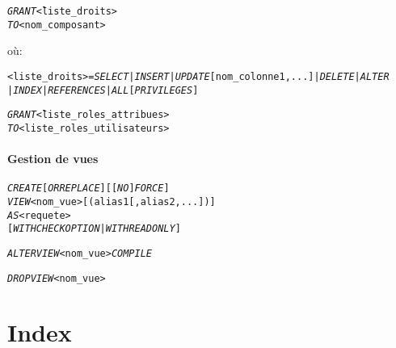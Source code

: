 \documentclass[10pt]{article}
\begin{document}
			\begin{alltt}
				\begin{tabbing}
					\emph{GRANT} \= <liste_droits>\\
					\emph{TO} \> <nom_composant>\\
					[\emph{WITH GRANT OPTION}]
				\end{tabbing}
			\end{alltt}
			
			où:
			\begin{alltt}
				\begin{tabbing}
					<liste_droits> =\= \emph{SELECT} | \emph{INSERT} | \emph{UPDATE} [nom_colonne1,...] | \emph{DELETE} | \emph{ALTER} \\
								\> | \emph{INDEX} | \emph{REFERENCES} | \emph{ALL} [\emph{PRIVILEGES}]
				\end{tabbing}
			\end{alltt}
			
			\begin{alltt}
				\begin{tabbing}
					\emph{GRANT} \= <liste_roles_attribues>\\
					\emph{TO} \> <liste_roles_utilisateurs>\\
					[\emph{WITH ADMIN OPTION}]
				\end{tabbing}
			\end{alltt}
			
		\subsection{Gestion de vues}
			\begin{alltt}
				\emph{CREATE} [\emph{OR REPLACE}] [[\emph{NO}] \emph{FORCE}]
				\emph{VIEW} <nom_vue> [(alias1[,alias2,...])]
				\emph{AS} <requete>
				[\emph{WITH CHECK OPTION} | \emph{WITH READ ONLY}]
				
				\emph{ALTER VIEW} <nom_vue> \emph{COMPILE}
				
				\emph{DROP VIEW} <nom_vue>
			\end{alltt}
			
\newpage
\part*{Index}
\tableofcontents
\newpage
\listoftables
\listoffigures
\renewcommand{\indexname}{Liste des mots-clefs SQL} \printindex
\end{document}
